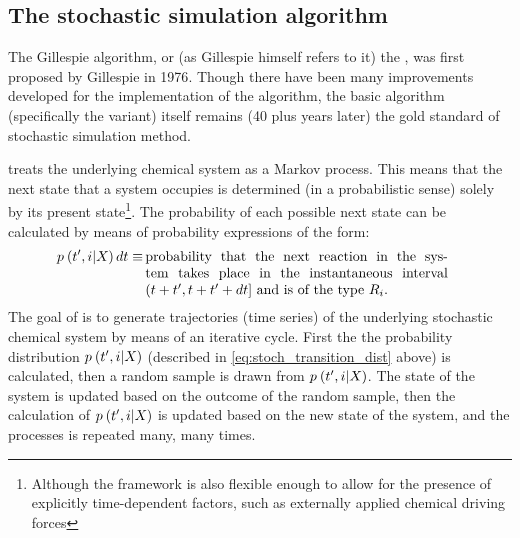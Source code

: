 \subsection{The stochastic simulation algorithm}

The Gillespie algorithm, or (as Gillespie himself refers to it\supercite{Gillespie:2013kk}) the , was first proposed by Gillespie in 1976\supercite{Gillespie:1976bj}. Though there have been many improvements developed for the implementation\supercite{Gibson:2000jqa,Cao:2004cua,Lok:2005ii,McCollum:2006hj} of the algorithm, the basic algorithm (specifically the  variant) itself remains (40 plus years later) the gold standard of stochastic simulation method.

 treats the underlying chemical system as a Markov process. This means that the next state that a system occupies is determined (in a probabilistic sense) solely by its present state\footnote{Although the framework is also flexible enough to allow for the presence of explicitly time-dependent factors, such as externally applied chemical driving forces}. The probability of each possible next state can be calculated by means of probability expressions of the form\supercite{Gillespie:1976bj}:
\begin{align}\label{eq:stoch_transition_dist}
    \transp \dt \equiv&\, \parbox[t]{0.63\linewidth}{probability that the next reaction in the system takes place in the instantaneous interval $\timeintp$ and is of the type $\rxn$.}
\end{align}
The goal of  is to generate trajectories (\ie time series) of the underlying stochastic chemical system by means of an iterative cycle. First the the probability distribution $p_{} \left( t', i | X_{} \right)$ (described in \eqref{eq:stoch_transition_dist} above) is calculated, then a random sample is drawn from $p_{} \left( t', i | X_{} \right)$. The state of the system is updated based on the outcome of the random sample, then the calculation of $p_{} \left( t', i | X_{} \right)$ is updated based on the new state of the system, and the processes is repeated many, many times.
 
